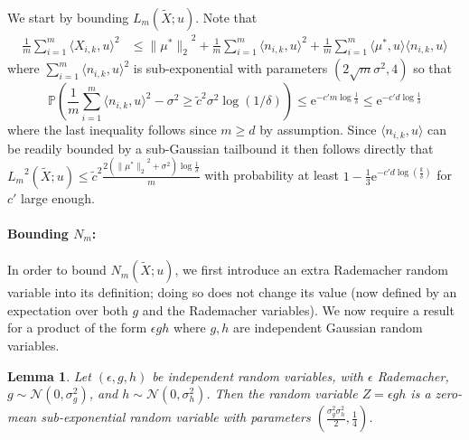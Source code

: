 \documentclass[twoside,11pt]{article}
\newtheorem{lems}{Lemma}
\newcommand{\Prob}{\ensuremath{{\mathbb{P}}}}
\newcommand{\NORMAL}{\ensuremath{\mathcal{N}}}
\def\E{ \mathrm{e} }							%
\newcommand{\norm}[1]{\ensuremath{\|#1\|_2}}
\newcommand{\paramobs}{\mu}
\newcommand{\trueparamobs}{\ensuremath{\paramobs^*}}
\newcommand{\kdim}{\ensuremath{k}}
\newcommand{\Xtil}{\ensuremath{\widetilde{X}}}
\newcommand{\lipproc}{\ensuremath{L_m}}
\newcommand{\processradN}{\ensuremath{N_m}}
\begin{document}
We start by bounding $\lipproc(\Xtil;u)$. Note that 
\begin{align*}
\frac{1}{m}\sum_{i=1}^{m} \langle X_{i,k},u\rangle^2 &\leq 
\norm{\trueparamobs}^2 + \frac{1}{m}\sum_{i=1}^m \langle n_{i,k},u\rangle^2 +
\frac{1}{m}\sum_{i=1}^m \langle \trueparamobs, u\rangle \langle n_{i,k},u\rangle
\end{align*}
where $\sum_{i=1}^m \langle n_{i,k}, u\rangle^2$ is 
sub-exponential with parameters $(2\sqrt{m} \sigma^2, 4)$ so that
\begin{equation*}
\Prob(\frac{1}{m}\sum_{i=1}^m \langle n_{i,k},u\rangle^2 - \sigma^2
\geq \tilde{c}^2 \sigma^2 \log (1/\delta)) \leq \E^{-c' m \log \frac{1}{\delta}} \leq \E^{-c' d \log \frac{1}{\delta}}
\end{equation*}
where the last inequality follows since $m  \geq d$ by assumption.
Since $\langle n_{i,k},u \rangle$ can be readily bounded by a sub-Gaussian tailbound
it then follows directly that $\lipproc^2(\Xtil;u) \leq \tilde{c}^2 \frac{2
    (\norm{\trueparamobs}^2 + \sigma^2) \log \frac{1}{\delta}}{m}$
with probability at least $1 - \frac{1}{3}\E^{-c' d \log (\frac{\kdim}{\delta})}$
for $c'$ large enough.
%

\paragraph{Bounding $\processradN$:}

In order to bound $\processradN(\Xtil;u)$, we first introduce an extra
Rademacher random variable into its definition; doing so does not
change its value (now defined by an expectation over both $g$ and the
Rademacher variables). We now require a result for a product of the
form $\epsilon g h$ where $g,h$ are independent Gaussian random
variables.
\begin{lems}
\label{LemProductGauss}
Let $(\epsilon, g, h)$ be independent random variables, with
$\epsilon$ Rademacher, \mbox{ $g \sim \NORMAL(0, \sigma_g^2)$,} and
\mbox{$h \sim \NORMAL(0, \sigma_h^2)$.}  Then the random variable $Z =
\epsilon g h$ is a zero-mean sub-exponential random variable with
parameters $(\frac{\sigma_g^2\sigma_h^2}{2}, \frac{1}{4})$.
\end{lems}
\end{document}
